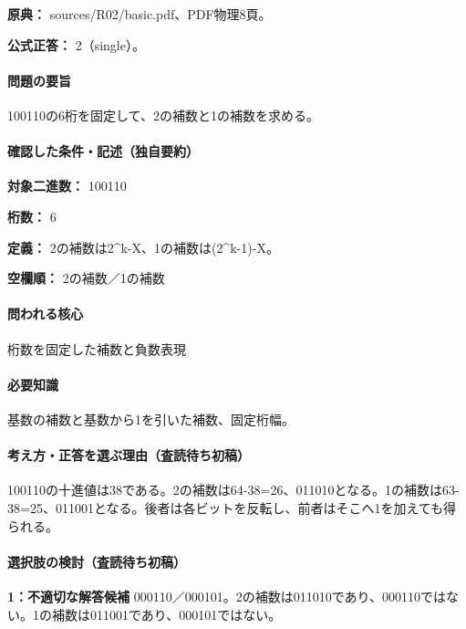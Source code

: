 \noindent\textbf{原典：} sources/R02/basic.pdf、PDF物理8頁。

\textbf{公式正答：} 2（single）。

\paragraph{問題の要旨} 100110の6桁を固定して、2の補数と1の補数を求める。

\paragraph{確認した条件・記述（独自要約）}\mbox{}\par

\noindent\textbf{対象二進数：} 100110\par

\noindent\textbf{桁数：} 6\par

\noindent\textbf{定義：} 2の補数は2\textasciicircum{}k-X、1の補数は(2\textasciicircum{}k-1)-X。\par

\noindent\textbf{空欄順：} 2の補数／1の補数\par

\paragraph{問われる核心} 桁数を固定した補数と負数表現

\paragraph{必要知識} 基数の補数と基数から1を引いた補数、固定桁幅。

\paragraph{考え方・正答を選ぶ理由（査読待ち初稿）} 100110の十進値は38である。2の補数は64-38=\allowbreak{}26、011010となる。1の補数は63-38=\allowbreak{}25、011001となる。後者は各ビットを反転し、前者はそこへ1を加えても得られる。

\paragraph{選択肢の検討（査読待ち初稿）}\mbox{}\par

\noindent\textbf{1：不適切な解答候補} 000110／000101。2の補数は011010であり、000110ではない。1の補数は011001であり、000101ではない。\par

